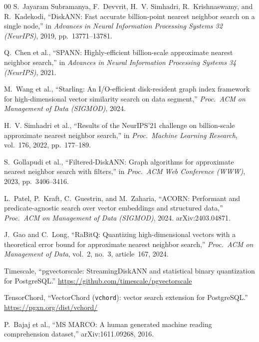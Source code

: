 \documentclass[sigconf, nonacm]{acmart}
\begin{document}
\begin{thebibliography}{00}
S.~Jayaram Subramanya, F.~Devvrit, H.~V. Simhadri, R.~Krishnaswamy, and R.~Kadekodi,
``DiskANN: Fast accurate billion-point nearest neighbor search on a single node,'' in
\textit{Advances in Neural Information Processing Systems 32 (NeurIPS)}, 2019,
pp.~13771--13781.

Q.~Chen et al., ``SPANN: Highly-efficient billion-scale approximate nearest neighbor
search,'' in \textit{Advances in Neural Information Processing Systems 34 (NeurIPS)}, 2021.

M.~Wang et al., ``Starling: An I/O-efficient disk-resident graph index framework for
high-dimensional vector similarity search on data segment,'' \textit{Proc.\ ACM on Management
of Data (SIGMOD)}, 2024.

H.~V. Simhadri et al., ``Results of the NeurIPS'21 challenge on billion-scale approximate
nearest neighbor search,'' in \textit{Proc.\ Machine Learning Research}, vol.~176, 2022,
pp.~177--189.

S.~Gollapudi et al., ``Filtered-DiskANN: Graph algorithms for approximate nearest neighbor
search with filters,'' in \textit{Proc.\ ACM Web Conference (WWW)}, 2023, pp.~3406--3416.

L.~Patel, P.~Kraft, C.~Guestrin, and M.~Zaharia, ``ACORN: Performant and predicate-agnostic
search over vector embeddings and structured data,'' \textit{Proc.\ ACM on Management of Data
(SIGMOD)}, 2024. arXiv:2403.04871.

J.~Gao and C.~Long, ``RaBitQ: Quantizing high-dimensional vectors with a theoretical error
bound for approximate nearest neighbor search,'' \textit{Proc.\ ACM on Management of Data},
vol.~2, no.~3, article~167, 2024.

Timescale, ``pgvectorscale: StreamingDiskANN and statistical binary quantization for
PostgreSQL.'' \url{https://github.com/timescale/pgvectorscale}

TensorChord, ``VectorChord (\texttt{vchord}): vector search extension for PostgreSQL.''
\url{https://pgxn.org/dist/vchord/}

P.~Bajaj et al., ``MS MARCO: A human generated machine reading comprehension
dataset,'' arXiv:1611.09268, 2016.

\end{thebibliography}
\end{document}
